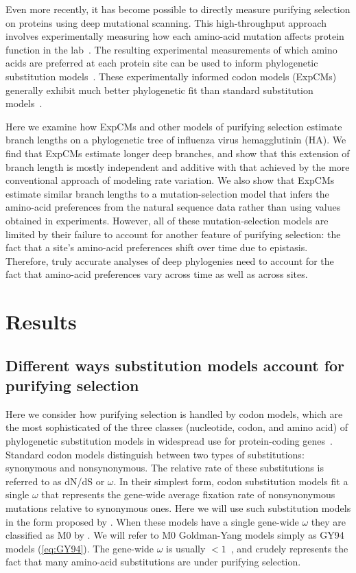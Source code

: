 \documentclass[11pt]{article}
\begin{document}
Even more recently, it has become possible to directly measure purifying selection on proteins using deep mutational scanning.
This high-throughput approach involves experimentally measuring how each amino-acid mutation affects protein function in the lab~\citep{fowler2014deep}.
The resulting experimental measurements of which amino acids are preferred at each protein site can be used to inform phylogenetic substitution models~\citep{bloom2014experimentally}.
These experimentally informed codon models (ExpCMs) generally exhibit much better phylogenetic fit than standard substitution models~\citep{doud2015site, hilton2017phydms, haddox2018mapping, lee2018deep}.

Here we examine how ExpCMs and other models of purifying selection estimate branch lengths on a phylogenetic tree of influenza virus hemagglutinin (HA). 
We find that ExpCMs estimate longer deep branches, and show that this extension of branch length is mostly independent and additive with that achieved by the more conventional approach of modeling rate variation. 
We also show that ExpCMs estimate similar branch lengths to a mutation-selection model that infers the amino-acid preferences from the natural sequence data rather than using values obtained in experiments.
However, all of these mutation-selection models are limited by their failure to account for another feature of purifying selection: the fact that a site's amino-acid preferences shift over time due to epistasis.
Therefore, truly accurate analyses of deep phylogenies need to account for the fact that amino-acid preferences vary across time as well as across sites.

\section*{Results}

\subsection*{Different ways substitution models account for purifying selection}
Here we consider how purifying selection is handled by codon models, which are the most sophisticated of the three classes (nucleotide, codon, and amino acid) of phylogenetic substitution models in widespread use for protein-coding genes~\citep{arenas2015trends}.
Standard codon models distinguish between two types of substitutions: synonymous and nonsynonymous.
The relative rate of these substitutions is referred to as dN/dS or $\omega$.
In their simplest form, codon substitution models fit a single $\omega$ that represents the gene-wide average fixation rate of nonsynonymous mutations relative to synonymous ones.
Here we will use such substitution models in the form proposed by \citet{goldman1994codon}.
When these models have a single gene-wide $\omega$ they are classified as M0 by \citet{yang2000codon}.
We will refer to M0 Goldman-Yang models simply as GY94 models (\ref{eq:GY94}). 
The gene-wide $\omega$ is usually $<1$~\citep{murrell2015gene}, and crudely represents the fact that many amino-acid substitutions are under purifying selection.
\end{document}
